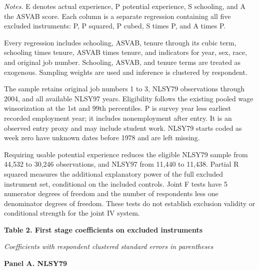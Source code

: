 \documentclass[10pt,letterpaper]{article}
\begin{document}
\medskip
{\footnotesize
\noindent\textit{Notes.} E denotes actual experience, P potential experience, S schooling, and A the ASVAB score. Each column is a separate regression containing all five excluded instruments: P, P squared, P cubed, S times P, and A times P.\par
\smallskip\noindent Every regression includes schooling, ASVAB, tenure through its cubic term, schooling times tenure, ASVAB times tenure, and indicators for year, sex, race, and original job number. Schooling, ASVAB, and tenure terms are treated as exogenous. Sampling weights are used and inference is clustered by respondent.\par
\smallskip\noindent The sample retains original job numbers 1 to 3, NLSY79 observations through 2004, and all available NLSY97 years. Eligibility follows the existing pooled wage winsorization at the 1st and 99th percentiles. P is survey year less earliest recorded employment year; it includes nonemployment after entry. It is an observed entry proxy and may include student work. NLSY79 starts coded as week zero have unknown dates before 1978 and are left missing.\par
\smallskip\noindent Requiring usable potential experience reduces the eligible NLSY79 sample from 44,532 to 30,246 observations, and NLSY97 from 11,440 to 11,438. Partial R squared measures the additional explanatory power of the full excluded instrument set, conditional on the included controls. Joint F tests have 5 numerator degrees of freedom and the number of respondents less one denominator degrees of freedom. These tests do not establish exclusion validity or conditional strength for the joint IV system.\par
}
\newpage
\begin{center}
{\large\bfseries Table 2. First stage coefficients on excluded instruments}\par
\smallskip
\textit{Coefficients with respondent clustered standard errors in parentheses}\par
\medskip
\end{center}
\small
\noindent\textbf{Panel A. NLSY79}\par\smallskip
\end{document}
